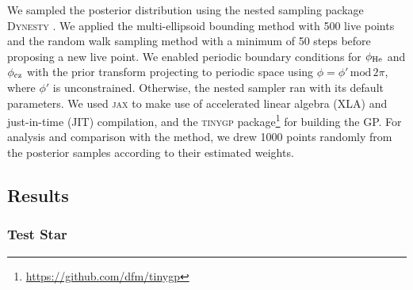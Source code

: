 We sampled the posterior distribution using the nested sampling package \textsc{Dynesty} \citep{Speagle2020,Koposov.Speagle.ea2023}. We applied the multi-ellipsoid bounding method \citep{Feroz.Hobson.ea2009} with 500 live points and the random walk sampling method \citep{Skilling2006} with a minimum of 50 steps before proposing a new live point. We enabled periodic boundary conditions for \(\phi_{{\mathrm{He}}}\) and \(\phi_{{\mathrm{cz}}}\) with the prior transform projecting to periodic space using \(\phi = \phi'\,\mathrm{mod}\,2\pi\), where \(\phi'\) is unconstrained. Otherwise, the nested sampler ran with its default parameters. We used \textsc{jax} \citep{Bradbury.Frostig.ea2018} to make use of accelerated linear algebra (XLA) and just-in-time (JIT) compilation, and the \textsc{tinygp} package\footnote{\url{https://github.com/dfm/tinygp}} for building the GP. For analysis and comparison with the  method, we drew 1000 points randomly from the posterior samples according to their estimated weights.


\subsection{Results}\label{sec:glitch-results}



\subsubsection{Test Star}

